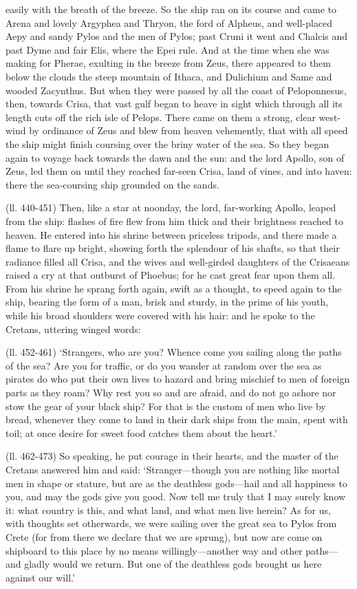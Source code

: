 easily with the breath of the breeze. So the ship ran on its course and came to
Arena and lovely Argyphea and Thryon, the ford of Alpheus, and well-placed Aepy
and sandy Pylos and the men of Pylos; past Cruni it went and Chalcis and past
Dyme and fair Elis, where the Epei rule. And at the time when she was making
for Pherae, exulting in the breeze from Zeus, there appeared to them below the
clouds the steep mountain of Ithaca, and Dulichium and Same and wooded
Zacynthus. But when they were passed by all the coast of Peloponnesus, then,
towards Crisa, that vast gulf began to heave in sight which through all its
length cuts off the rich isle of Pelops. There came on them a strong, clear
west-wind by ordinance of Zeus and blew from heaven vehemently, that with all
speed the ship might finish coursing over the briny water of the sea. So they
began again to voyage back towards the dawn and the sun: and the lord Apollo,
son of Zeus, led them on until they reached far-seen Crisa, land of vines, and
into haven: there the sea-coursing ship grounded on the sands.

(ll. 440-451) Then, like a star at noonday, the lord, far-working Apollo,
leaped from the ship: flashes of fire flew from him thick and their brightness
reached to heaven. He entered into his shrine between priceless tripods, and
there made a flame to flare up bright, showing forth the splendour of his
shafts, so that their radiance filled all Crisa, and the wives and well-girded
daughters of the Crisaeans raised a cry at that outburst of Phoebus; for he
cast great fear upon them all. From his shrine he sprang forth again, swift as
a thought, to speed again to the ship, bearing the form of a man, brisk and
sturdy, in the prime of his youth, while his broad shoulders were covered with
his hair: and he spoke to the Cretans, uttering winged words:

(ll. 452-461) ‘Strangers, who are you? Whence come you sailing along the
paths of the sea? Are you for traffic, or do you wander at random over the sea
as pirates do who put their own lives to hazard and bring mischief to men of
foreign parts as they roam? Why rest you so and are afraid, and do not go
ashore nor stow the gear of your black ship? For that is the custom of men who
live by bread, whenever they come to land in their dark ships from the main,
spent with toil; at once desire for sweet food catches them about the
heart.’

(ll. 462-473) So speaking, he put courage in their hearts, and the master of
the Cretans answered him and said: ‘Stranger—though you are nothing
like mortal men in shape or stature, but are as the deathless gods—hail
and all happiness to you, and may the gods give you good. Now tell me truly
that I may surely know it: what country is this, and what land, and what men
live herein? As for us, with thoughts set otherwards, we were sailing over the
great sea to Pylos from Crete (for from there we declare that we are sprung),
but now are come on shipboard to this place by no means willingly—another
way and other paths—and gladly would we return. But one of the deathless
gods brought us here against our will.’


